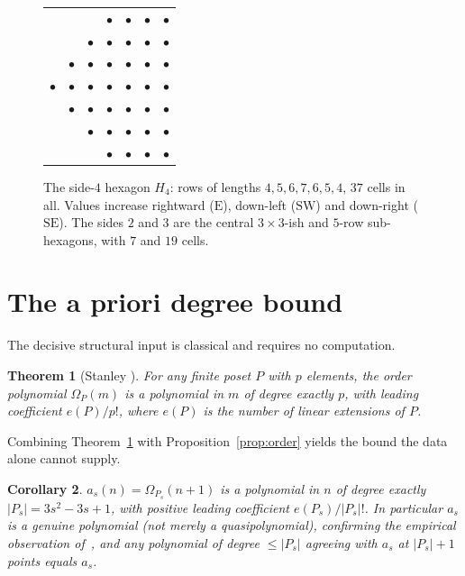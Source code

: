 \documentclass[11pt]{article}
\theoremstyle{plain}
\newtheorem{theorem}{Theorem}
\newtheorem{corollary}[theorem]{Corollary}
\theoremstyle{definition}
\theoremstyle{remark}
\newcommand{\Eseq}{\mathrm{E}}
\newcommand{\SW}{\mathrm{SW}}
\newcommand{\SE}{\mathrm{SE}}
\newcommand{\Om}{\Omega}
\begin{document}
\begin{figure}[h]
\centering
\setlength{\tabcolsep}{3pt}
\ttfamily
\begin{tabular}{ccccccc}
 & & & $\bullet$ & $\bullet$ & $\bullet$ & $\bullet$\\[-1pt]
 & & $\bullet$ & $\bullet$ & $\bullet$ & $\bullet$ & $\bullet$\\[-1pt]
 & $\bullet$ & $\bullet$ & $\bullet$ & $\bullet$ & $\bullet$ & $\bullet$\\[-1pt]
$\bullet$ & $\bullet$ & $\bullet$ & $\bullet$ & $\bullet$ & $\bullet$ & $\bullet$\\[-1pt]
 & $\bullet$ & $\bullet$ & $\bullet$ & $\bullet$ & $\bullet$ & $\bullet$\\[-1pt]
 & & $\bullet$ & $\bullet$ & $\bullet$ & $\bullet$ & $\bullet$\\[-1pt]
 & & & $\bullet$ & $\bullet$ & $\bullet$ & $\bullet$
\end{tabular}
\rmfamily
\caption{The side-$4$ hexagon $H_4$: rows of lengths $4,5,6,7,6,5,4$, $37$ cells in all. Values
increase rightward ($\Eseq$), down-left ($\SW$) and down-right ($\SE$). The sides $2$ and $3$ are the
central $3\times3$-ish and $5$-row sub-hexagons, with $7$ and $19$ cells.}
\end{figure}

\section{The a priori degree bound}\label{sec:degree}

The decisive structural input is classical and requires no computation.

\begin{theorem}[Stanley {\cite[\S3.15.2, p.~344]{EC1}}]\label{thm:stanley-deg}
For any finite poset $P$ with $p$ elements, the order polynomial $\Om_P(m)$ is a polynomial in $m$
of degree exactly $p$, with leading coefficient $e(P)/p!$, where $e(P)$ is the number of linear
extensions of $P$.
\end{theorem}

Combining Theorem~\ref{thm:stanley-deg} with Proposition~\ref{prop:order} yields the bound the data
alone cannot supply.

\begin{corollary}\label{cor:deg}
$a_s(n)=\Om_{P_s}(n+1)$ is a polynomial in $n$ of degree exactly $\lvert P_s\rvert=3s^2-3s+1$, with
positive leading coefficient $e(P_s)/\lvert P_s\rvert!$. In particular $a_s$ is a genuine polynomial
(not merely a quasipolynomial), confirming the empirical observation of~\cite{KK23}, and any
polynomial of degree $\le\lvert P_s\rvert$ agreeing with $a_s$ at $\lvert P_s\rvert+1$ points equals
$a_s$.
\end{corollary}
\end{document}
